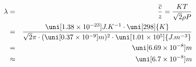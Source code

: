 \begin{eqnarray*}
\lambda
&=&
\frac
{
\overline{c} 
}
{
z
}
=
\frac{
KT
}{
\sqrt{2}\rho P
}
\\ &=&
\frac{
\uni[1.38 \times 10^{-23}]{J.K^{-1}}
\cdot 
\uni[298]{K}
}{
\sqrt{2} \pi 
\cdot 
(
\uni[0.37 \times 10^{-9}]{m}
)^{2}
\cdot
\uni[1.01 \times 10^5]{J.m^{-3}}
}
\\ &=&
\uni[6.69 \times 10^{-8}]{m}
\\ &\approx&
\uni[6.7 \times 10^{-8}]{m}
\label{}
\end{eqnarray*}
